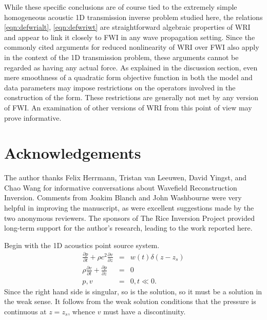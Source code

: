 While these specific conclusions are of course tied to the extremely
simple homogeneous acoustic 1D transmission inverse problem studied
here, the relations \ref{eqn:defwrialt}, \ref{eqn:defwriwt} are
straightforward algebraic properties of WRI and appear to link it
closely to FWI in any wave propagation setting. Since the commonly
cited arguments for reduced nonlinearity of WRI over FWI also apply in
the context of the 1D transmission problem, these arguments cannot be
regarded as having any actual force. As explained in the
discussion section, even mere smoothness of a quadratic form objective
function in both the model and data parameters may impose restrictions
on the operators involved in the construction of the form. These
restrictions are generally not met by any version of FWI. An
examination of other versions of WRI from this point of view may prove
informative.

\section{Acknowledgements}
The author thanks Felix Herrmann, Tristan van Leeuwen, David Yingst,
and Chao Wang for informative conversations about Wavefield
Reconstruction Inversion. Comments from Joakim Blanch and John
Washbourne were very helpful in improving the manuscript, as were
excellent suggestions made by the two anonymous reviewers. The sponsors of The Rice
Inversion Project provided long-term support for the author's
research, leading to the work reported here.




Begin with the 1D acoustics point source system. 
\begin{eqnarray}
\label{eqn:awe1dptsrc}
\frac{\partial p}{\partial t} +\rho c^2\frac{\partial 
  v}{\partial z} &=& w(t)\delta(z-z_s) \nonumber\\
\rho \frac{\partial v}{\partial t} + \frac{\partial p}{\partial 
  z}&=&0\nonumber\\
 p,v&=&0, t \ll 0. 
\end{eqnarray}
Since the right hand side is singular, so is the solution, so it must
be a solution in the weak sense. It follows from the weak solution
conditions that the pressure is continuous at $z=z_s$, whence $v$ must
have a discontinuity. 


